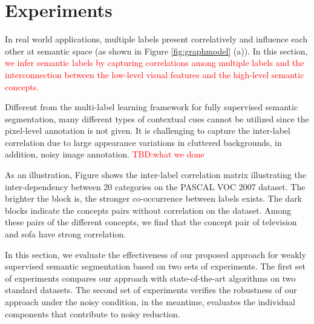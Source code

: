 \section{Experiments}
\if
In real world applications, multiple labels present correlatively and influence each other at semantic space (as shown in Figure \ref{fig:graphmodel} (a)). In this section, {\textcolor{red}{we infer semantic labels by capturing correlations among multiple labels and the interconnection between the low-level visual features and the high-level semantic concepts.}}

Different from the multi-label learning framework for fully supervised semantic segmentation, many different types of contextual cues cannot be utilized since the pixel-level annotation is not given. It is challenging to capture the inter-label correlation due to large appearance variations in cluttered backgrounds, in addition, noisy image annotation. {\textcolor{red}{TBD:what we done}}

As an illustration, Figure shows the inter-label correlation matrix illustrating the inter-dependency between 20 categories on the PASCAL VOC 2007 dataset. The brighter the block is, the stronger co-occurrence between labels exists. The dark blocks indicate the concepts pairs without correlation on the dataset.
Among these pairs of the different concepts, we find that the concept pair of television and sofa have strong correlation.
\fi

In this section, we evaluate the effectiveness of our proposed approach for weakly supervised semantic segmentation based on two sets of experiments. The first set of experiments compares our approach with state-of-the-art algorithms on two standard datasets. The second set of experiments verifies the robustness of our approach under the noisy condition, in the meantime, evaluates the individual components that contribute to noisy reduction.

